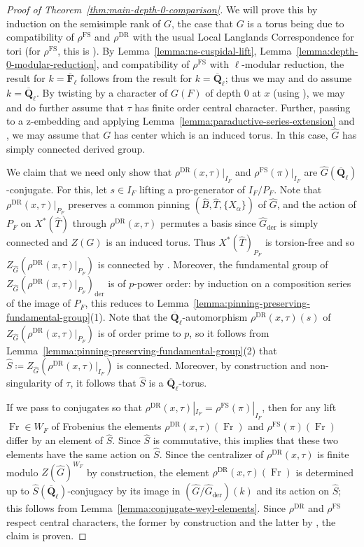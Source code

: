 \documentclass[reqno]{amsart}
\numberwithin{equation}{subsection}
\newcommand{\F}{\mathbf{F}}
\newcommand{\Q}{\mathbf{Q}}
\newcommand{\ol}[1]{\overline{#1}}
\newcommand{\wh}[1]{\widehat{#1}}
\DeclareMathOperator{\FS}{FS}
\DeclareMathOperator{\der}{der}
\DeclareMathOperator{\DR}{DR}
\DeclareMathOperator{\Fr}{Fr}
\theoremstyle{remark}
\numberwithin{equation}{subsection}
\numberwithin{figure}{subsection}
\begin{document}
\begin{proof}[Proof of Theorem~\ref{thm:main-depth-0-comparison}]
    We will prove this by induction on the semisimple rank of $G$, the case that $G$ is a torus being due to compatibility of $\rho^{\FS}$ and $\rho^{\DR}$ with the usual Local Langlands Correspondence for tori (for $\rho^{\FS}$, this is \cite[Theorem~I.9.6(i)]{FS}). By Lemma~\ref{lemma:ns-cuspidal-lift}, Lemma~\ref{lemma:depth-0-modular-reduction}, and compatibility of $\rho^{\FS}$ with $\ell$-modular reduction, the result for $k = \ol\F_\ell$ follows from the result for $k = \ol\Q_\ell$; thus we may and do assume $k = \ol\Q_\ell$. By twisting by a character of $G(F)$ of depth $0$ at $x$ (using \cite[Theorem~I.9.6(ii)]{FS}), we may and do further assume that $\tau$ has finite order central character. Further, passing to a z-embedding and applying Lemma~\ref{lemma:paraductive-series-extension} and \cite[Theorem~I.9.6(v)]{FS}, we may assume that $G$ has center which is an induced torus. In this case, $\wh G$ has simply connected derived group.

    We claim that we need only show that $\rho^{\DR}(x, \tau)|_{I_F}$ and $\rho^{\FS}(\pi)|_{I_F}$ are $\wh G(\ol\Q_\ell)$-conjugate. For this, let $s \in I_F$ lifting a pro-generator of $I_F/P_F$. Note that $\rho^{\DR}(x, \tau)|_{P_F}$ preserves a common pinning $(\wh B, \wh T, \{X_\alpha\})$ of $\wh G$, and the action of $P_F$ on $X^*(\wh T)$ through $\rho^{\DR}(x, \tau)$ permutes a basis since $\wh G_{\der}$ is simply connected and $Z(G)$ is an induced torus. Thus $X^*(\wh T)_{P_F}$ is torsion-free and so $Z_{\wh G}(\rho^{\DR}(x, \tau)|_{P_F})$ is connected by \cite[Proposition 4.1(d)]{Hai15}. Moreover, the fundamental group of $Z_{\wh G}(\rho^{\DR}(x, \tau)|_{P_F})_{\der}$ is of $p$-power order: by induction on a composition series of the image of $P_F$, this reduces to Lemma~\ref{lemma:pinning-preserving-fundamental-group}(1). Note that the $\ol\Q_\ell$-automorphism $\rho^{\DR}(x,\tau)(s)$ of $Z_{\wh G}(\rho^{\DR}(x, \tau)|_{P_F})$ is of order prime to $p$, so it follows from Lemma~\ref{lemma:pinning-preserving-fundamental-group}(2) that $\wh S \coloneqq Z_{\wh G}(\rho^{\DR}(x, \tau)|_{I_F})$ is connected. Moreover, by construction and non-singularity of $\tau$, it follows that $\wh S$ is a $\ol\Q_\ell$-torus.
    
    If we pass to conjugates so that $\rho^{\DR}(x, \tau)|_{I_F} = \rho^{\FS}(\pi)|_{I_F}$, then for any lift $\Fr \in W_F$ of Frobenius the elements $\rho^{\DR}(x,\tau)(\Fr)$ and $\rho^{\FS}(\pi)(\Fr)$ differ by an element of $\wh S$. Since $\wh S$ is commutative, this implies that these two elements have the same action on $\wh S$. Since the centralizer of $\rho^{\DR}(x, \tau)$ is finite modulo $Z(\wh G)^{W_F}$ by construction, the element $\rho^{\DR}(x,\tau)(\Fr)$ is determined up to $\wh S(\ol\Q_\ell)$-conjugacy by its image in $(\wh G/\wh G_{\der})(k)$ and its action on $\wh S$; this follows from Lemma~\ref{lemma:conjugate-weyl-elements}. Since $\rho^{\DR}$ and $\rho^{\FS}$ respect central characters, the former by construction and the latter by \cite[Theorem~I.9.6(iii)]{FS}, the claim is proven.


\end{proof}
\end{document}
